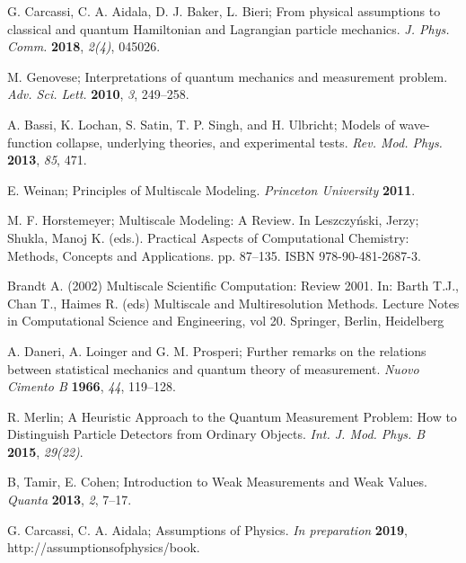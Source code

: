 \documentclass[11pt]{article}
\begin{document}
\begin{thebibliography}{999}
	G. Carcassi, C. A. Aidala, D. J. Baker, L. Bieri; From physical assumptions to classical and quantum {Hamiltonian} and {Lagrangian} particle mechanics. {\em J. Phys. Comm.} {\bf 2018}, {\em 2(4)}, 045026.
	
	M. Genovese; Interpretations of quantum mechanics and measurement problem. {\em Adv. Sci. Lett.} {\bf 2010}, {\em 3}, 249--258.
	
	A. Bassi, K. Lochan, S. Satin, T. P. Singh, and H. Ulbricht; Models of wave-function collapse, underlying theories, and experimental tests. {\em Rev. Mod. Phys.} {\bf 2013}, {\em 85}, 471.
	
	E. Weinan; Principles of Multiscale Modeling. {\em Princeton University} {\bf 2011}.
	
	M. F. Horstemeyer; Multiscale Modeling: A Review. In Leszczyński, Jerzy; Shukla, Manoj K. (eds.). Practical Aspects of Computational Chemistry: Methods, Concepts and Applications. pp. 87–135. ISBN 978-90-481-2687-3.
	
	Brandt A. (2002) Multiscale Scientific Computation: Review 2001. In: Barth T.J., Chan T., Haimes R. (eds) Multiscale and Multiresolution Methods. Lecture Notes in Computational Science and Engineering, vol 20. Springer, Berlin, Heidelberg
	
	A. Daneri, A. Loinger and G. M. Prosperi; Further remarks on the relations between statistical mechanics and quantum theory of measurement. {\em Nuovo Cimento B} {\bf 1966}, {\em 44}, 119--128.
	
	R. Merlin; A Heuristic Approach to the Quantum Measurement Problem: How to Distinguish Particle Detectors from Ordinary Objects. {\em Int. J. Mod. Phys. B} {\bf 2015}, {\em 29(22)}.
	
	B, Tamir, E. Cohen; Introduction to Weak Measurements and Weak Values. {\em Quanta} {\bf 2013}, {\em 2}, 7–17.
	
	G. Carcassi, C. A. Aidala; Assumptions of Physics. {\em In preparation} {\bf 2019}, http://assumptionsofphysics/book.
	
\end{thebibliography}
\end{document}
